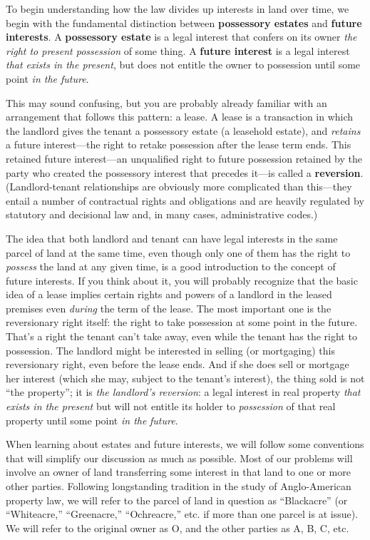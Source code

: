 To begin understanding how the law divides up interests in land over time, we
begin with the fundamental distinction between \textbf{possessory
estates} and \textbf{future interests}. A \textbf{possessory estate}
is a legal interest that confers on its owner \textit{the right to
present possession} of some thing. A \textbf{future interest} is a legal
interest \textit{that exists in the present}, but does not entitle the
owner to possession until some point \textit{in the future}.

This may sound confusing, but you are probably already familiar with an
arrangement that follows this pattern: a lease. A lease is a transaction in
which the landlord gives the tenant a possessory estate (a leasehold estate),
and \textit{retains} a future interest---the right to retake possession after
the lease term ends. This retained future interest---an unqualified right to
future possession retained by the party who created the possessory interest
that precedes it---is called a \textbf{reversion}. (Landlord-tenant
relationships are obviously more complicated than this---they entail a number
of contractual rights and obligations and are heavily regulated by statutory
and decisional law and, in many cases, administrative codes.)

The idea that both landlord and tenant can have legal interests in the same
parcel of land at the same time, even though only one of them has the right to
\textit{possess} the land at any given time, is a good introduction to the
concept of future interests. If you think about it, you will probably recognize
that the basic idea of a lease implies certain rights and powers of a landlord
in the leased premises even \textit{during} the term of the lease. The most
important one is the reversionary right itself: the right to take possession at
some point in the future. That's a right the tenant can't take away, even while
the tenant has the right to possession. The landlord might be interested in
selling (or mortgaging) this reversionary right, even before the lease ends.
And if she does sell or mortgage her interest (which she may, subject to the
tenant's interest), the thing sold is not ``the property''; it is \textit{the
landlord's reversion}: a legal interest in real property \textit{that exists in
the present} but will not entitle its holder to \textit{possession} of that
real property until some point \textit{in the} \textit{future}.

When learning about estates and future interests, we will follow some
conventions that will simplify our discussion as much as possible. Most of our
problems will involve an owner of land transferring some interest in that land
to one or more other parties. Following longstanding tradition in the study of
Anglo-American property law, we will refer to the parcel of land in question as
``Blackacre'' (or ``Whiteacre,'' ``Greenacre,'' ``Ochreacre,'' etc. if more
than one parcel is at issue). We will refer to the original owner as O, and the
other parties as A, B, C, etc.

